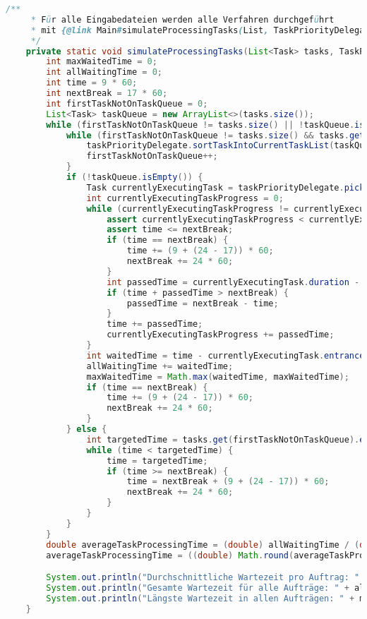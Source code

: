 \documentclass[a4paper,10pt,ngerman]{scrartcl}
\begin{document}
\newpage
\begin{lstlisting}[frame=single,language=Java,title=Methode simulateProcessingTasks,breaklines=true]
	/**
     * Für alle Eingabedateien werden alle Verfahren durchgeführt
     * mit {@link Main#simulateProcessingTasks(List, TaskPriorityDelegate)}.
     */
	private static void simulateProcessingTasks(List<Task> tasks, TaskPriorityDelegate taskPriorityDelegate) {
        int maxWaitedTime = 0;
        int allWaitingTime = 0;
        int time = 9 * 60;
        int nextBreak = 17 * 60;
        int firstTaskNotOnTaskQueue = 0;
        List<Task> taskQueue = new ArrayList<>(tasks.size());
        while (firstTaskNotOnTaskQueue != tasks.size() || !taskQueue.isEmpty()) {
            while (firstTaskNotOnTaskQueue != tasks.size() && tasks.get(firstTaskNotOnTaskQueue).entranceTime <= time) {
                taskPriorityDelegate.sortTaskIntoCurrentTaskList(taskQueue, tasks.get(firstTaskNotOnTaskQueue));
                firstTaskNotOnTaskQueue++;
            }
            if (!taskQueue.isEmpty()) {
                Task currentlyExecutingTask = taskPriorityDelegate.pickTask(taskQueue);
                int currentlyExecutingTaskProgress = 0;
                while (currentlyExecutingTaskProgress != currentlyExecutingTask.duration) {
                    assert currentlyExecutingTaskProgress < currentlyExecutingTask.duration;
                    assert time <= nextBreak;
                    if (time == nextBreak) {
                        time += (9 + (24 - 17)) * 60;
                        nextBreak += 24 * 60;
                    }
                    int passedTime = currentlyExecutingTask.duration - currentlyExecutingTaskProgress;
                    if (time + passedTime > nextBreak) {
                        passedTime = nextBreak - time;
                    }
                    time += passedTime;
                    currentlyExecutingTaskProgress += passedTime;
                }
                int waitedTime = time - currentlyExecutingTask.entranceTime;
                allWaitingTime += waitedTime;
                maxWaitedTime = Math.max(waitedTime, maxWaitedTime);
                if (time == nextBreak) {
                    time += (9 + (24 - 17)) * 60;
                    nextBreak += 24 * 60;
                }
            } else {
                int targetedTime = tasks.get(firstTaskNotOnTaskQueue).entranceTime;
                while (time < targetedTime) {
                    time = targetedTime;
                    if (time >= nextBreak) {
                        time = nextBreak + (9 + (24 - 17)) * 60;
                        nextBreak += 24 * 60;
                    }
                }
            }
        }
        double averageTaskProcessingTime = (double) allWaitingTime / (double) tasks.size();
        averageTaskProcessingTime = ((double) Math.round(averageTaskProcessingTime * 10)) / 10;

        System.out.println("Durchschnittliche Wartezeit pro Auftrag: " + averageTaskProcessingTime + " minuten");
        System.out.println("Gesamte Wartezeit für alle Aufträge: " + allWaitingTime + " minuten");
        System.out.println("Längste Wartezeit in allen Aufträgen: " + maxWaitedTime + " minuten");
    }
	\end{lstlisting}
\end{document}
